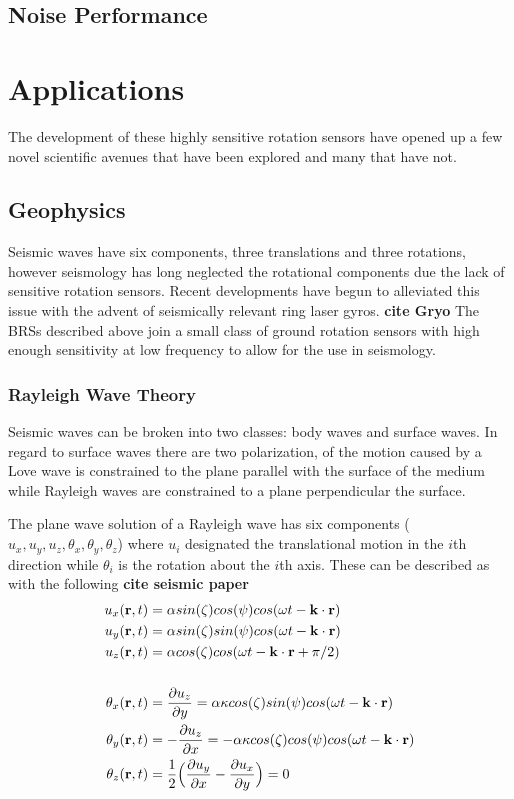 \documentclass [12pt, proquest]{uwthesis}[2019]
\begin{document}
\section{Noise Performance}

\chapter{Applications}
\quad The development of these highly sensitive rotation sensors have opened up a few novel scientific avenues that have been explored and many that have not.

\section{Geophysics}
Seismic waves have six components, three translations and three rotations, however seismology has long neglected the rotational components due the lack of sensitive rotation sensors. Recent developments have begun to alleviated this issue with the advent of seismically relevant ring laser gyros. \textbf{cite Gryo} The BRSs described above join a small class of ground rotation sensors with high enough sensitivity at low frequency to allow for the use in seismology.
\subsection{Rayleigh Wave Theory}

Seismic waves can be broken into two classes: body waves and surface waves. In regard to surface waves there are two polarization, of the motion caused by a Love wave is constrained to the plane parallel with the surface of the medium while Rayleigh waves are constrained to a plane perpendicular the surface. 

The plane wave solution of a Rayleigh wave has six components ($u_x, u_y, u_z, \theta_x, \theta_y, \theta_z$) where $u_i$ designated the translational motion in the $i$th direction while $\theta_i$ is the rotation about the $i$th axis.
These can be described as with the following \textbf{cite seismic paper}
\begin{align}
u_x({\bf r} ,t)&=\alpha sin(\zeta) cos(\psi) cos(\omega t-{\bf k}\cdot{\bf r})\\
u_y({\bf r} ,t)&=\alpha sin(\zeta) sin(\psi) cos(\omega t-{\bf k}\cdot{\bf r})\\
u_z({\bf r} ,t)&=\alpha cos(\zeta) cos(\omega t-{\bf k}\cdot{\bf r}+\pi/2)\label{ZEq}\\
\notag \\
\theta_x({\bf r} ,t)&=\frac{\partial u_z}{\partial y}=\alpha \kappa cos(\zeta) sin(\psi) cos(\omega t-{\bf k}\cdot{\bf r})\label{TiltXEq}\\
\theta_y({\bf r} ,t)&=-\frac{\partial u_z}{\partial x}=-\alpha \kappa cos(\zeta) cos(\psi) cos(\omega t-{\bf k}\cdot{\bf r})\\
\theta_z({\bf r} ,t)&=\frac{1}{2}\Big(\frac{\partial u_y}{\partial x}-\frac{\partial u_x}{\partial y}\Big)=0
\end{align}
\end{document}
